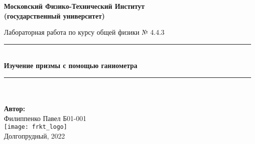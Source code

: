 \newcommand{\HRule}{\rule{\linewidth}{0.7mm}} %
	
	\begin{center}
		\large\textbf{Московский Физико-Технический Институт}\\ %
		\large\textbf{(государственный университет)}
	
		\vfill
		
		\Large Лабораторная работа по курсу общей физики № 4.4.3\\[0.5cm] %
		
		
		\HRule
		\\[0.4cm]
		{ \huge \bfseries Изучение призмы с помощью ганиометра}%
		\\[0.4cm] 
		\HRule
		\\[0.5cm]
		
		\ \\
	\textbf{\large Автор:} \\	
	\large Филиппенко Павел Б01-001\\ %
		\vfill
		\hspace*{-0.8 cm}\texttt{[image: frkt\_logo]}\\ %
		\large Долгопрудный, 2022 %
	\end{center}

\newpage
\setcounter{page}{2}
\fancyfoot[c]{\thepage}
\fancyhead[R]{}